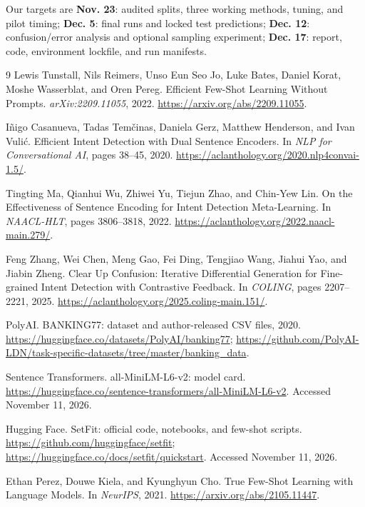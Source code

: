 \documentclass{article}
\begin{document}
Our targets are \textbf{Nov. 23}: audited splits, three working methods, tuning, and pilot timing; \textbf{Dec. 5}: final runs and locked test predictions; \textbf{Dec. 12}: confusion/error analysis and optional sampling experiment; \textbf{Dec. 17}: report, code, environment lockfile, and run manifests.

\clearpage
\begin{thebibliography}{9}
Lewis Tunstall, Nils Reimers, Unso Eun Seo Jo, Luke Bates, Daniel Korat, Moshe Wasserblat, and Oren Pereg.
Efficient Few-Shot Learning Without Prompts. \emph{arXiv:2209.11055}, 2022.
\url{https://arxiv.org/abs/2209.11055}.

I\~nigo Casanueva, Tadas Tem\v{c}inas, Daniela Gerz, Matthew Henderson, and Ivan Vuli\'c.
Efficient Intent Detection with Dual Sentence Encoders.
In \emph{NLP for Conversational AI}, pages 38--45, 2020.
\url{https://aclanthology.org/2020.nlp4convai-1.5/}.

Tingting Ma, Qianhui Wu, Zhiwei Yu, Tiejun Zhao, and Chin-Yew Lin.
On the Effectiveness of Sentence Encoding for Intent Detection Meta-Learning.
In \emph{NAACL-HLT}, pages 3806--3818, 2022.
\url{https://aclanthology.org/2022.naacl-main.279/}.

Feng Zhang, Wei Chen, Meng Gao, Fei Ding, Tengjiao Wang, Jiahui Yao, and Jiabin Zheng.
Clear Up Confusion: Iterative Differential Generation for Fine-grained Intent Detection with Contrastive Feedback.
In \emph{COLING}, pages 2207--2221, 2025.
\url{https://aclanthology.org/2025.coling-main.151/}.


PolyAI. BANKING77: dataset and author-released CSV files, 2020.
\url{https://huggingface.co/datasets/PolyAI/banking77};
\url{https://github.com/PolyAI-LDN/task-specific-datasets/tree/master/banking_data}.

Sentence Transformers. all-MiniLM-L6-v2: model card.
\url{https://huggingface.co/sentence-transformers/all-MiniLM-L6-v2}.
Accessed November 11, 2026.

Hugging Face. SetFit: official code, notebooks, and few-shot scripts.
\url{https://github.com/huggingface/setfit};
\url{https://huggingface.co/docs/setfit/quickstart}.
Accessed November 11, 2026.


Ethan Perez, Douwe Kiela, and Kyunghyun Cho.
True Few-Shot Learning with Language Models.
In \emph{NeurIPS}, 2021. \url{https://arxiv.org/abs/2105.11447}.

\end{thebibliography}
\end{document}
